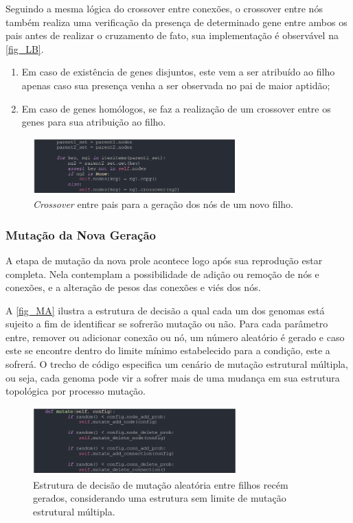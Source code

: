 Seguindo a mesma lógica do crossover entre conexões, o crossover entre nós também realiza uma verificação da presença de determinado gene entre ambos os pais antes de realizar o cruzamento de fato, sua implementação é observável na \autoref{fig_LB}.

\begin{enumerate}
	\item Em caso de existência de genes disjuntos, este vem a ser atribuído ao filho apenas caso sua presença venha a  ser observada no pai de maior aptidão;
	\item Em caso de genes homólogos, se faz a realização de um crossover entre os genes para sua atribuição ao filho.
\end{enumerate}

\begin{figure}[htb]
        \centering
        \caption{\label{fig_LB}\textit{Crossover} entre pais para a geração dos nós de um novo filho.}
        \includegraphics[width=0.7\textwidth]{images/LB.png}
\end{figure}

\subsubsection{Mutação da Nova Geração}
A etapa de mutação da nova prole acontece logo após sua reprodução estar completa. Nela contemplam a possibilidade de adição ou remoção de nós e conexões, e a alteração de pesos das conexões e viés dos nós.

A \autoref{fig_MA} ilustra a estrutura de decisão a qual cada um dos genomas está sujeito a fim de identificar se sofrerão mutação ou não. Para cada parâmetro entre, remover ou adicionar conexão ou nó, um número aleatório é gerado e caso este se encontre dentro do limite mínimo estabelecido para a condição, este a sofrerá. O trecho de código especifica um cenário de mutação estrutural múltipla, ou seja, cada genoma pode vir a sofrer mais de uma mudança em sua estrutura topológica por processo mutação.

\begin{figure}[htb]
        \centering
        \caption{\label{fig_MA}Estrutura de decisão de mutação aleatória entre filhos recém gerados, considerando uma estrutura sem limite de mutação estrutural múltipla.}
        \includegraphics[width=0.7\textwidth]{images/MA.png}
\end{figure}


